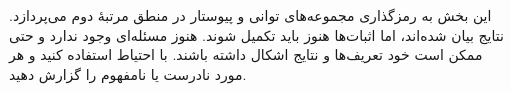 \documentclass[../../../include/open-logic-chapter]{subfiles}
\begin{document}

\begin{editorial}
این بخش به رمزگذاری مجموعه‌های توانی و پیوستار در منطق مرتبهٔ دوم
می‌پردازد. نتایج بیان شده‌اند، اما اثبات‌ها هنوز باید تکمیل شوند. هنوز
مسئله‌ای وجود ندارد و حتی ممکن است خود تعریف‌ها و نتایج اشکال داشته
باشند. با احتیاط استفاده کنید و هر مورد نادرست یا نامفهوم را گزارش دهید.
\end{editorial}





\OLEndChapterHook
\end{document}
